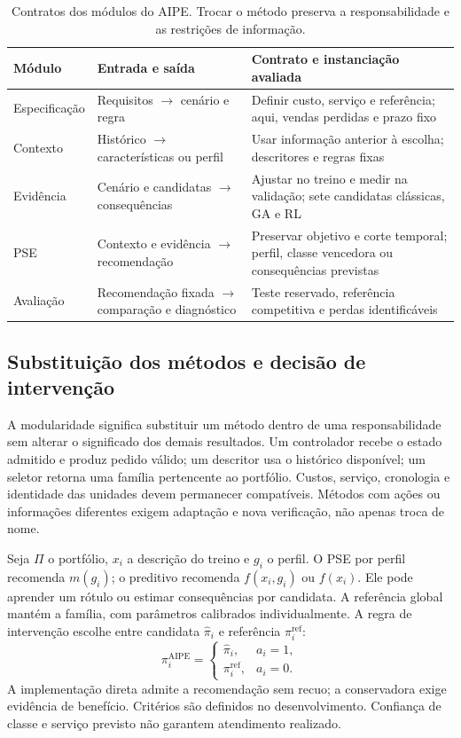 \documentclass[preprint,12pt]{elsarticle}
\begin{document}
\begin{table}[htbp]\centering\small
\caption{Contratos dos módulos do AIPE. Trocar o método preserva a responsabilidade e as restrições de informação.}\label{tab:modules}
\begin{tabular}{@{}p{2.4cm}p{4.0cm}p{4.8cm}@{}}\toprule
Módulo & Entrada e saída & Contrato e instanciação avaliada\\\midrule
Especificação & Requisitos $\to$ cenário e regra & Definir custo, serviço e referência; aqui, vendas perdidas e prazo fixo\\
Contexto & Histórico $\to$ características ou perfil & Usar informação anterior à escolha; descritores e regras fixas\\
Evidência & Cenário e candidatas $\to$ consequências & Ajustar no treino e medir na validação; sete candidatas clássicas, GA e RL\\
PSE & Contexto e evidência $\to$ recomendação & Preservar objetivo e corte temporal; perfil, classe vencedora ou consequências previstas\\
Avaliação & Recomendação fixada $\to$ comparação e diagnóstico & Teste reservado, referência competitiva e perdas identificáveis\\\bottomrule
\end{tabular}\end{table}

\subsection{Substituição dos métodos e decisão de intervenção}
A modularidade significa substituir um método dentro de uma responsabilidade sem alterar o significado dos demais resultados. Um controlador recebe o estado admitido e produz pedido válido; um descritor usa o histórico disponível; um seletor retorna uma família pertencente ao portfólio. Custos, serviço, cronologia e identidade das unidades devem permanecer compatíveis. Métodos com ações ou informações diferentes exigem adaptação e nova verificação, não apenas troca de nome.

Seja $\Pi$ o portfólio, $x_i$ a descrição do treino e $g_i$ o perfil. O PSE por perfil recomenda $m(g_i)$; o preditivo recomenda $f(x_i,g_i)$ ou $f(x_i)$. Ele pode aprender um rótulo ou estimar consequências por candidata. A referência global mantém a família, com parâmetros calibrados individualmente. A regra de intervenção escolhe entre candidata $\widehat\pi_i$ e referência $\pi_i^{\mathrm{ref}}$:
\[
 \pi_i^{\mathrm{AIPE}}=
 \begin{cases}\widehat\pi_i,&a_i=1,\\\pi_i^{\mathrm{ref}},&a_i=0.\end{cases}
\]
A implementação direta admite a recomendação sem recuo; a conservadora exige evidência de benefício. Critérios são definidos no desenvolvimento. Confiança de classe e serviço previsto não garantem atendimento realizado.
\end{document}
